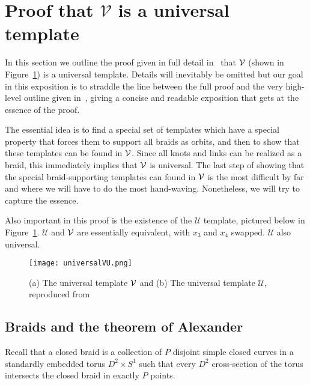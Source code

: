 \documentclass[paper.tex]{subfiles}
\begin{document}
\section{Proof that $\mathcal{V}$ is a universal template}

In this section we outline the proof given in full detail in~\cite{Ghrist1996} that $\mathcal{V}$ (shown in Figure~\ref{fig:universal}) is a universal template. Details will inevitably be omitted but our goal in this exposition is to straddle the line between
the full proof and the very high-level outline given in~\cite{knottyode}, giving a concise and readable exposition that gets at the essence of the proof.

The essential idea is to find a special set of templates which have a special property that forces them to support all braids as orbits, and then to show that these templates can be found in $\mathcal{V}$. Since all knots and links
can be realized as a braid, this immediately implies that $\mathcal{V}$ is universal. The last step of showing that the special braid-supporting templates can found in $\mathcal{V}$ is the most difficult by far and where we will have to do the
most hand-waving. Nonetheless, we will try to capture the essence.

Also important in this proof is the existence of the $\mathcal{U}$ template, pictured below in Figure~\ref{fig:universal}. $\mathcal{U}$ and $\mathcal{V}$ are essentially equivalent, with $x_3$ and $x_4$ swapped. $\mathcal{U}$ also universal.

\begin{figure}[h]

  \centering
  \texttt{[image: universalVU.png]}
  \caption{(a) The universal template $\mathcal{V}$ and (b) The universal template $\mathcal{U}$, reproduced from~\cite{ghs1997}}\label{fig:universal}
\end{figure}


\subsection{Braids and the theorem of Alexander}

Recall that a closed braid is a collection of $P$ disjoint simple closed curves in a standardly embedded torus $D^2 \times S^1$ such that every $D^2$ cross-section of the torus intersects the closed braid in exactly $P$ points.
\end{document}
